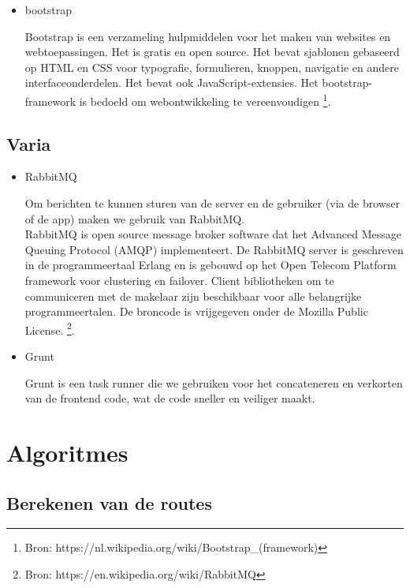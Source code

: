 \documentclass[11pt,twoside,a4paper]{article}
\begin{document}
\begin{itemize}
	\item bootstrap
	
Bootstrap is een verzameling hulpmiddelen voor het maken van websites en webtoepassingen. Het is gratis en open source. Het bevat sjablonen gebaseerd op HTML en CSS voor typografie, formulieren, knoppen, navigatie en andere interfaceonderdelen. Het bevat ook JavaScript-extensies. Het bootstrap-framework is bedoeld om webontwikkeling te vereenvoudigen	\footnote{Bron: https://nl.wikipedia.org/wiki/Bootstrap\_(framework)}.
	
	\end{itemize}
	
	
	\subsection{Varia}

	\begin{itemize}
	
	\item RabbitMQ
	
	Om berichten te kunnen sturen van de server en de gebruiker (via de browser of de app) maken we gebruik van RabbitMQ.\\
	
RabbitMQ is open source message broker software dat het Advanced Message Queuing Protocol (AMQP) implementeert. De RabbitMQ server is geschreven in de programmeertaal Erlang en is gebouwd op het Open Telecom Platform framework voor clustering en failover. Client bibliotheken om te communiceren met de makelaar zijn beschikbaar voor alle belangrijke programmeertalen. De broncode is vrijgegeven onder de Mozilla Public License. \footnote{Bron: https://en.wikipedia.org/wiki/RabbitMQ}.

	\item Grunt
	
Grunt is een task runner die we gebruiken voor het concateneren en verkorten van de frontend code, wat de code sneller en veiliger maakt.

	\end{itemize}	
	
	\section{Algoritmes}
	
	\subsection{Berekenen van de routes}	
	
\end{document}
